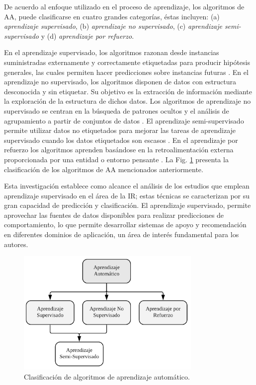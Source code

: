 \documentclass[journal]{IEEEtran}
\begin{document}
De acuerdo al enfoque utilizado en el proceso de aprendizaje, los algoritmos de AA, puede clasificarse en cuatro grandes categorías, éstas incluyen: (a) \textit{aprendizaje supervisado}, (b) \textit{aprendizaje no supervisado}, (c) \textit{aprendizaje semi-supervisado} y (d) \textit{aprendizaje por refuerzo}. 

En el aprendizaje supervisado, los algoritmos razonan desde instancias suministradas externamente y correctamente etiquetadas para producir hipótesis generales, las cuales permiten hacer predicciones sobre instancias futuras \cite{kotsiantis2007supervised}. En el aprendizaje no supervisado, los algoritmos disponen de datos con estructura desconocida y sin etiquetar. Su objetivo es la extracción de información mediante la exploración de la estructura de dichos datos. Los algoritmos de aprendizaje no supervisado se centran en la búsqueda de patrones ocultos y el análisis de agrupamiento a partir de conjuntos de datos \cite{celebi2016unsupervised}. El aprendizaje semi-supervisado permite utilizar datos no etiquetados para mejorar las tareas de aprendizaje supervisado cuando los datos etiquetados son escasos \cite{Knox2018}. En el aprendizaje por refuerzo los algoritmos aprenden basándose en la retroalimentación externa proporcionada por una entidad o entorno pensante \cite{sutton1998reinforcement}. La Fig. \ref{fig:1} presenta la clasificación de los algoritmos de AA mencionados anteriormente.

Esta investigación establece como alcance el análisis de los estudios que emplean aprendizaje supervisado en el área de la IR; estas técnicas se caracterizan por su gran capacidad de predicción y clasificación. El aprendizaje supervisado, permite aprovechar las fuentes de datos disponibles para realizar predicciones de comportamiento, lo que permite desarrollar sistemas de apoyo y recomendación en diferentes dominios de aplicación, un área de interés fundamental para los autores.

\begin{figure}[!t]
\centering
\includegraphics[width=3.5in]{figures/Figure1.png}
\caption{Clasificación de algoritmos de aprendizaje automático.}
\label{fig:1}
\end{figure}
\end{document}
